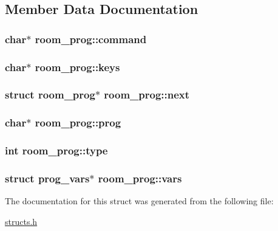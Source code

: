\subsection{Member Data Documentation}
\hypertarget{structroom__prog_a785c039ae10bd7e7fdac5c9b8a048cd1}{
\subsubsection[{command}]{\setlength{\rightskip}{0pt plus 5cm}char$\ast$ room\-\_\-prog\-::command}}\label{structroom__prog_a785c039ae10bd7e7fdac5c9b8a048cd1}
\hypertarget{structroom__prog_a97a2bb1c30f4b7f1af4d5dd3aac64693}{
\subsubsection[{keys}]{\setlength{\rightskip}{0pt plus 5cm}char$\ast$ room\-\_\-prog\-::keys}}\label{structroom__prog_a97a2bb1c30f4b7f1af4d5dd3aac64693}
\hypertarget{structroom__prog_afa84c0c83a57a395e7d7bb1645741f6c}{
\subsubsection[{next}]{\setlength{\rightskip}{0pt plus 5cm}struct {\bf room\-\_\-prog}$\ast$ room\-\_\-prog\-::next}}\label{structroom__prog_afa84c0c83a57a395e7d7bb1645741f6c}
\hypertarget{structroom__prog_a879dff7e316425c48fee99392d5c06f5}{
\subsubsection[{prog}]{\setlength{\rightskip}{0pt plus 5cm}char$\ast$ room\-\_\-prog\-::prog}}\label{structroom__prog_a879dff7e316425c48fee99392d5c06f5}
\hypertarget{structroom__prog_ad84ce03878d550aa9d2d5beb81871e04}{
\subsubsection[{type}]{\setlength{\rightskip}{0pt plus 5cm}int room\-\_\-prog\-::type}}\label{structroom__prog_ad84ce03878d550aa9d2d5beb81871e04}
\hypertarget{structroom__prog_a3f846626322a515475608f1b328b1528}{
\subsubsection[{vars}]{\setlength{\rightskip}{0pt plus 5cm}struct {\bf prog\-\_\-vars}$\ast$ room\-\_\-prog\-::vars}}\label{structroom__prog_a3f846626322a515475608f1b328b1528}


The documentation for this struct was generated from the following file\-:\begin{DoxyCompactItemize}
\item 
\hyperlink{structs_8h}{structs.\-h}\end{DoxyCompactItemize}
